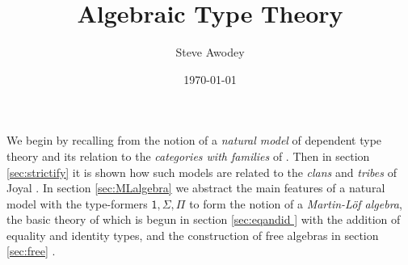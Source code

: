 \documentclass[12pt]{article}
\newcommand{\C}{\ensuremath{\mathbb{C}}}
\newcommand{\op}[1]{\ensuremath{{#1}^{\mathsf{op}}}}
\newcommand{\Set}{\ensuremath{\mathsf{Set}}}
\newcommand{\Cat}{\ensuremath{\mathsf{Cat}}}
\newcommand{\too}{\ensuremath{\longrightarrow}}
\theoremstyle{remark}
\theoremstyle{definition}
\begin{document}


\title{Algebraic Type Theory}
\author{Steve Awodey}
\date{\today}
\maketitle







We begin by recalling from \cite{awodey:NM} the notion of a \emph{natural model} of dependent type theory and its relation to the \emph{categories with families} of \cite{dybjer:CwF}.  Then in section \ref{sec:strictify} it is shown how such models are related to the \emph{clans} and \emph{tribes} of Joyal \cite{Joyal:clan}.  In section \ref{sec:MLalgebra} we abstract the main features of a natural model with the type-formers $\mathsf{1}, \Sigma, \Pi$ to form the notion of a \emph{Martin-L\"of algebra}, the basic theory of which is begun in section \ref{sec:eqandid } with the addition of equality and identity types, and the construction of free algebras in section \ref{sec:free} . 
\end{document}

